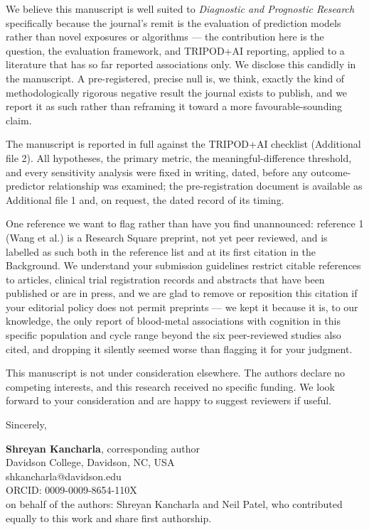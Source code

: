 \documentclass[12pt]{article}
\begin{document}
We believe this manuscript is well suited to \textit{Diagnostic and Prognostic Research} specifically because the journal's remit is the evaluation of prediction models rather than novel exposures or algorithms --- the contribution here is the question, the evaluation framework, and TRIPOD+AI reporting, applied to a literature that has so far reported associations only. We disclose this candidly in the manuscript. A pre-registered, precise null is, we think, exactly the kind of methodologically rigorous negative result the journal exists to publish, and we report it as such rather than reframing it toward a more favourable-sounding claim.

The manuscript is reported in full against the TRIPOD+AI checklist (Additional file 2). All hypotheses, the primary metric, the meaningful-difference threshold, and every sensitivity analysis were fixed in writing, dated, before any outcome-predictor relationship was examined; the pre-registration document is available as Additional file 1 and, on request, the dated record of its timing.

One reference we want to flag rather than have you find unannounced: reference 1 (Wang et al.) is a Research Square preprint, not yet peer reviewed, and is labelled as such both in the reference list and at its first citation in the Background. We understand your submission guidelines restrict citable references to articles, clinical trial registration records and abstracts that have been published or are in press, and we are glad to remove or reposition this citation if your editorial policy does not permit preprints --- we kept it because it is, to our knowledge, the only report of blood-metal associations with cognition in this specific population and cycle range beyond the six peer-reviewed studies also cited, and dropping it silently seemed worse than flagging it for your judgment.

This manuscript is not under consideration elsewhere. The authors declare no competing interests, and this research received no specific funding. We look forward to your consideration and are happy to suggest reviewers if useful.

\bigskip

Sincerely,

\bigskip

\textbf{Shreyan Kancharla}, corresponding author \\
Davidson College, Davidson, NC, USA \\
shkancharla@davidson.edu \\
ORCID: 0009-0009-8654-110X \\
on behalf of the authors: Shreyan Kancharla and Neil Patel, who contributed equally to this work and share first authorship.
\end{document}
